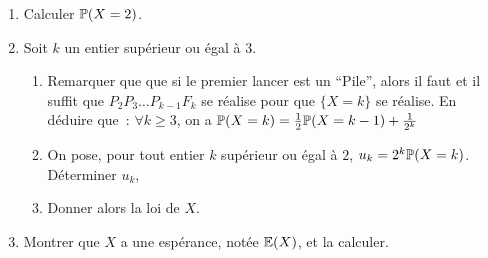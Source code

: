 \documentclass[a4paper]{tp_um}
\begin{document}
\begin{enumerate}

\item  Calculer $\P(X=2)$.
\vspace*{5cm}

\item  Soit $k$ un entier sup\'erieur ou \'egal \`a $3$.

 \begin{enumerate}
\item Remarquer que  que si le premier lancer est un ``Pile'', alors il faut et il suffit que $P_2 P_3 \dots P_{k-1}F_k$ se
	r\'ealise pour que $\{X=k\}$ se r\'ealise.  En d\'eduire que~: $\forall k\ge 3$, on a $\P(X=k)={1\over 2} \P(X=k-1)+{1\over
2^k}$
\vspace*{5cm}
\newpage
\item On pose, pour tout entier $k$ sup\'erieur ou \'egal \`a $2$, $u_k= 2^k\P(X = k)$. D\'eterminer $u_k$,
	
	\vspace*{5cm}

\item Donner alors la loi de $X$.\vspace*{5cm}

\end{enumerate}
\item Montrer que $X$ a une esp\'erance, not\'ee $\E(X)$, et la calculer.\vspace*{5cm}

%
%
%
%
%
%
\end{enumerate}
\end{document}
